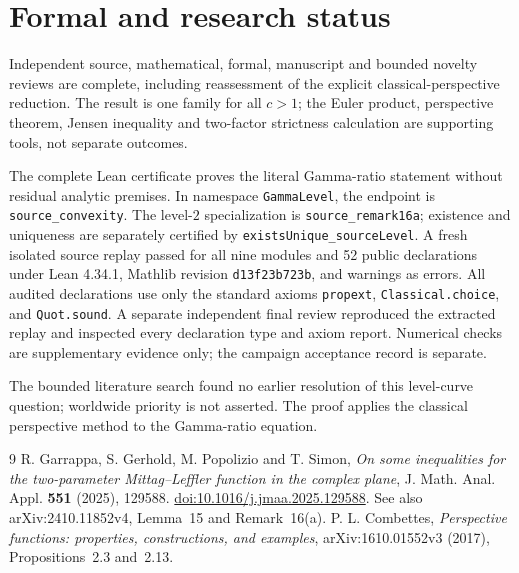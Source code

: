 \documentclass[11pt]{article}
\begin{document}
\section{Formal and research status}
Independent source, mathematical, formal, manuscript and bounded novelty
reviews are complete, including reassessment of the explicit
classical-perspective reduction. The result is one family for all $c>1$;
the Euler product, perspective theorem, Jensen inequality and two-factor
strictness calculation are supporting tools, not separate outcomes.

The complete Lean certificate proves the literal Gamma-ratio statement
without residual analytic premises. In namespace \texttt{GammaLevel},
the endpoint is \texttt{source\_convexity}.
The level-$2$ specialization is \texttt{source\_remark16a}; existence and
uniqueness are separately certified by \texttt{existsUnique\_sourceLevel}.
A fresh isolated source replay passed for all nine modules and 52 public
declarations under Lean 4.34.1, Mathlib revision
\texttt{d13f23b723b}, and warnings as errors.
All audited declarations use only the standard axioms \texttt{propext},
\texttt{Classical.choice}, and \texttt{Quot.sound}.
A separate independent final review reproduced the extracted replay and
inspected every declaration type and axiom report. Numerical checks are
supplementary evidence only; the campaign acceptance record is separate.

The bounded literature search found no earlier resolution of this level-curve
question; worldwide priority is not asserted. The proof applies the classical
perspective method to the Gamma-ratio equation.

\begin{thebibliography}{9}
 R. Garrappa, S. Gerhold, M. Popolizio and T. Simon,
\emph{On some inequalities for the two-parameter Mittag--Leffler function
in the complex plane}, J. Math. Anal. Appl. \textbf{551} (2025), 129588.
\href{https://doi.org/10.1016/j.jmaa.2025.129588}{doi:10.1016/j.jmaa.2025.129588}.
See also arXiv:2410.11852v4, Lemma~15 and Remark~16(a).
 P. L. Combettes,
\emph{Perspective functions: properties, constructions, and examples},
arXiv:1610.01552v3 (2017), Propositions~2.3 and~2.13.
\end{thebibliography}
\end{document}
